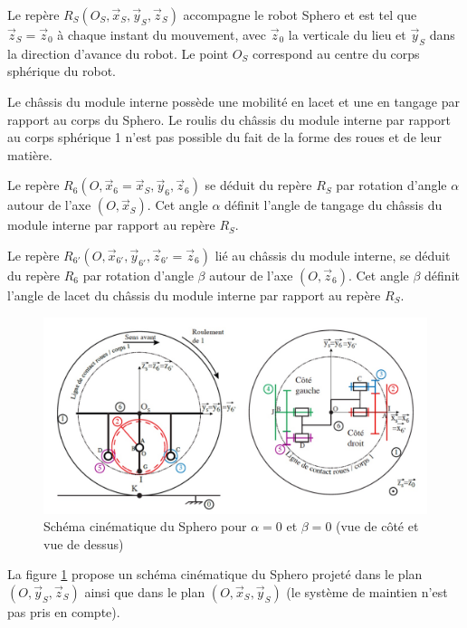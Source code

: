 Le repère $R_S(O_S,\overrightarrow{x}_S,\overrightarrow{y}_S,\overrightarrow{z}_S)$ accompagne le robot Sphero et est tel que $\overrightarrow{z}_S=\overrightarrow{z}_0$ à chaque instant du mouvement, avec $\overrightarrow{z}_0$ la verticale du lieu et $\overrightarrow{y}_S$ dans la direction d'avance du robot. Le point $O_S$ correspond au centre du corps sphérique du robot.

Le châssis du module interne possède une mobilité en lacet et une en tangage par rapport au corps du Sphero. 
Le roulis du châssis du module interne par rapport au corps sphérique 1 n'est pas possible du fait de la forme des roues et de leur matière. 

Le repère $R_6(O,\overrightarrow{x}_6=\overrightarrow{x}_S,\overrightarrow{y}_6,\overrightarrow{z}_6)$ se déduit du repère $R_S$ par rotation d'angle $\alpha$ autour de l'axe $(O,\overrightarrow{x}_S)$. Cet angle $\alpha$ définit l'angle de tangage du châssis du module interne par rapport au repère $R_S$.

Le repère $R_{6'}(O,\overrightarrow{x}_{6'},\overrightarrow{y}_{6'},\overrightarrow{z}_{6'}=\overrightarrow{z}_6)$ lié au châssis du module interne, se déduit du repère $R_6$ par rotation d'angle $\beta$ autour de l'axe $(O,\overrightarrow{z}_6)$. Cet angle $\beta$ définit l'angle de lacet du châssis du module interne par rapport au repère $R_S$.

\begin{figure}[!ht]\begin{center}
 \includegraphics[width=0.85\linewidth]{img/figure_12}
 \caption{Schéma cinématique du Sphero pour $\alpha=0$ et $\beta=0$ (vue de côté et vue de dessus)}
 \label{fig12}
\end{center}\end{figure}

La figure \ref{fig12} propose un schéma cinématique du Sphero projeté dans le plan $(O,\overrightarrow{y}_S,\overrightarrow{z}_S)$ ainsi que dans le plan $(O,\overrightarrow{x}_S,\overrightarrow{y}_S)$ (le système de maintien n'est pas pris en compte). 

